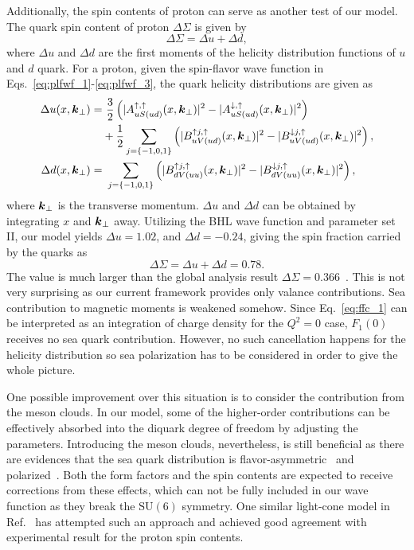 \documentclass[aps,prc,preprint,groupedaddress,showpacs,superscriptaddress,floatfix]{revtex4-1}
\renewcommand{\vec}[1]{\ensuremath\boldsymbol{#1}}
\newcommand{\duarrow}{\ensuremath{{\downarrow,\uparrow}}}
\newcommand{\uuarrow}{\ensuremath{\uparrow,\uparrow}}
\begin{document}
Additionally, the spin contents of proton can serve as another test of our model. The quark spin content of proton $\Delta \Sigma$ is given by
%
\begin{equation}
  \Delta \Sigma = \Delta u + \Delta d,
\end{equation}
%
where $\Delta u$ and $\Delta d$ are the first moments of the helicity distribution functions of $u$ and $d$ quark. 
For a proton, given the spin-flavor wave function in Eqs.~\eqref{eq:plfwf_1}-\eqref{eq:plfwf_3}, the quark helicity distributions are given as
%
\begin{align}
  \Delta u(x, \vec{k}_\perp) =&\ \frac{3}{2} \left( \lvert A^{\uuarrow}_{uS(ud)} (x, \vec{k}_\perp) \rvert^2 - \lvert A^{\duarrow}_{uS(ud)} (x, \vec{k}_\perp) \rvert^2 \right) \nonumber\\
  &+ \frac{1}{2} \sum_{j=\{-1,0,1\}} \left(\lvert B^{\uparrow j, \uparrow}_{uV(ud)} (x, \vec{k}_\perp) \rvert^2 - \lvert B^{\downarrow j, \uparrow}_{uV(ud)} (x, \vec{k}_\perp) \rvert^2 \right), \label{eq:su} \\
  \Delta d(x, \vec{k}_\perp) =&\ \sum_{j=\{-1,0,1\}}
  \left( \lvert B^{\uparrow j,\uparrow}_{dV(uu)} (x, \vec{k}_\perp) \rvert^2 - \lvert B^{\downarrow j,\uparrow}_{dV(uu)} (x, \vec{k}_\perp) \rvert^2 \right), \label{eq:sd}
\end{align}
%
where $\vec{k}_\perp$ is the transverse momentum. $\Delta u$ and $\Delta d$ can be obtained by integrating $x$ and $\vec{k}_\perp$ away. 
Utilizing the BHL wave function and parameter set II, our model yields $\Delta u = 1.02$, and $\Delta d = -0.24$, giving the spin fraction carried by the quarks as
\begin{equation} \label{eq:spin_fraction}
  \Delta \Sigma = \Delta u + \Delta d = 0.78.
\end{equation}
The value is much larger than the global analysis result $\Delta \Sigma = 0.366$~\cite{deFlorian_global_2008}.
This is not very surprising as our current framework provides only valance contributions.
Sea contribution to magnetic moments is weakened somehow. 
Since Eq.~\eqref{eq:ffc_1} can be interpreted as an integration of charge density for the $Q^2=0$ case, $F_1(0)$ receives no sea quark contribution.
However, no such cancellation happens for the helicity distribution so sea polarization has to be considered in order to give the whole picture.

One possible improvement over this situation is to consider the contribution from the meson clouds. 
In our model, some of the higher-order contributions can be effectively absorbed into the diquark degree of freedom by adjusting the parameters.
Introducing the meson clouds, nevertheless, is still beneficial as there are evidences that the sea quark distribution is flavor-asymmetric~\cite{Ma:2000uv} and polarized~\cite{deFlorian_global_2008}. 
Both the form factors and the spin contents are expected to receive corrections from these effects, which can not be fully included in our wave function as they break the $\mathrm{SU}(6)$ symmetry. 
One similar light-cone model in Ref.~\cite{cloet_nucleon_2012} has attempted such an approach and achieved good agreement with experimental result for the proton spin contents. 
\end{document}
